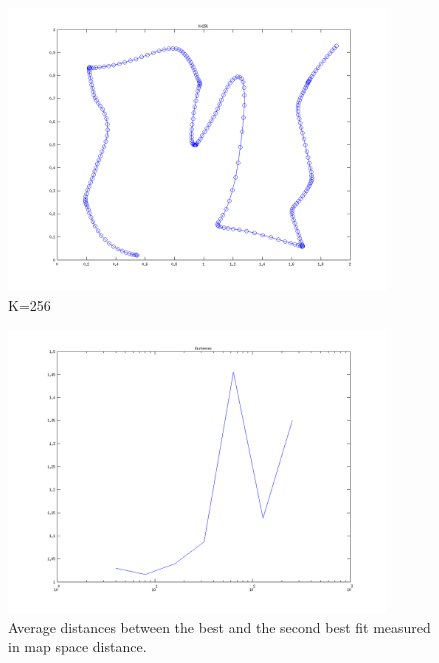 \documentclass{article}
\begin{document}
		\begin{figure}[H]
			\includegraphics[width=10cm]{k256.png}
			\caption{K=256}
		\end{figure}
		
		\begin{figure}[H]
			\includegraphics[width=10cm]{distances.png}
			\caption{Average distances between the best and the second best fit measured in map space distance.}
		\end{figure}
	
\end{document}

